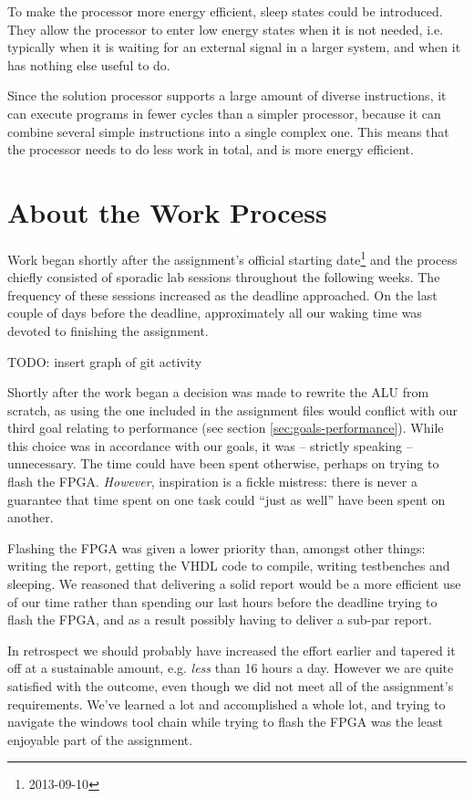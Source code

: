 To make the processor more energy efficient, sleep states could be introduced.
They allow the processor to enter low energy states when it is not needed, i.e. typically when it is waiting for an external signal in a larger system, and when it has nothing else useful to do.

Since the solution processor supports a large amount of diverse instructions, it can execute programs in fewer cycles than a simpler processor, because it can combine several simple instructions into a single complex one.
This means that the processor needs to do less work in total, and is more energy efficient.

\section{About the Work Process}

Work began shortly after the assignment's official starting date\footnote{2013-09-10} and the process chiefly consisted of sporadic lab sessions throughout the following weeks.
The frequency of these sessions increased as the deadline approached.
On the last couple of days before the deadline, approximately all our waking time was devoted to finishing the assignment.

TODO: insert graph of git activity

Shortly after the work began a decision was made to rewrite the ALU from scratch, as using the one included in the assignment files would conflict with our third goal relating to performance (see section \vref{sec:goals-performance}).
While this choice was in accordance with our goals, it was -- strictly speaking -- unnecessary.
The time could have been spent otherwise, perhaps on trying to flash the FPGA.
\textit{However}, inspiration is a fickle mistress: there is never a guarantee that time spent on one task could ``just as well'' have been spent on another.

Flashing the FPGA was given a lower priority than, amongst other things: writing the report, getting the VHDL code to compile, writing testbenches and sleeping.
We reasoned that delivering a solid report would be a more efficient use of our time rather than spending our last hours before the deadline trying to flash the FPGA, and as a result possibly having to deliver a sub-par report.

In retrospect we should probably have increased the effort earlier and tapered it off at a sustainable amount, e.g. \textit{less} than 16 hours a day.
However we are quite satisfied with the outcome, even though we did not meet all of the assignment's requirements.
We've learned a lot and accomplished a whole lot, and trying to navigate the windows tool chain while trying to flash the FPGA was the least enjoyable part of the assignment.


